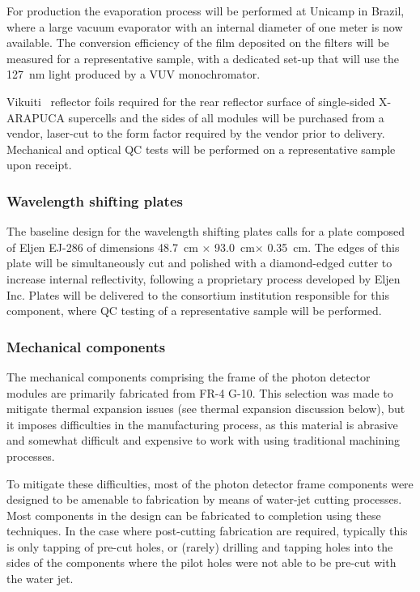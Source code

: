 For   production the evaporation process will be performed at Unicamp in Brazil, where a large vacuum evaporator with an internal diameter of one meter is now available. The conversion efficiency of the film deposited on the filters will be measured for a representative sample, with a dedicated set-up that will use the \SI{127}{nm} light produced by a VUV monochromator.

Vikuiti \texttrademark\ reflector foils required for the rear reflector surface of single-sided X-ARAPUCA supercells and the sides of all modules will be purchased from a vendor, laser-cut to the form factor required by the vendor prior to delivery.  Mechanical and optical QC tests will be performed on a representative sample upon receipt.

\subsubsection{Wavelength shifting plates}

The baseline design for the wavelength shifting plates calls for a plate  composed of Eljen EJ-286 of dimensions \SI{48.7}{cm} $\times$ \SI{93.0}{cm}$\times$ \SI{0.35}{cm}.  The edges of this plate will be simultaneously cut and polished with a diamond-edged cutter to increase internal reflectivity, following a proprietary process developed by Eljen Inc.  Plates will be delivered to the consortium institution responsible for this component, where QC testing of a representative sample will be performed.

\subsubsection{Mechanical components}

The mechanical components comprising the frame of the photon detector modules are primarily fabricated from FR-4 G-10.  This selection was made to mitigate thermal expansion issues (see thermal expansion discussion below), but it imposes difficulties in the manufacturing process, as this material is abrasive and somewhat difficult and expensive to work with using traditional machining processes.

To mitigate these difficulties, most of the photon detector frame components were designed to be amenable to fabrication by means of water-jet cutting processes.  Most components in the design can be fabricated to completion using these techniques.  In the case where post-cutting fabrication are required, typically this is only tapping of pre-cut holes, or (rarely) drilling and tapping holes into the sides of the components where the pilot holes were not able to be pre-cut with the water jet.

